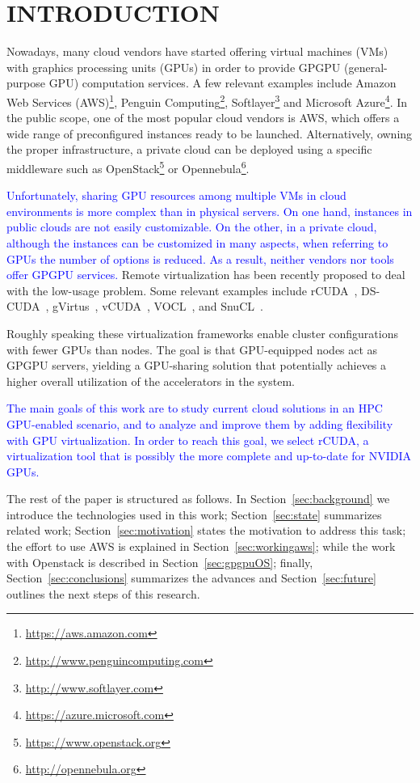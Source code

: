 \documentclass[a4paper,twoside]{article}
\begin{document}
\section{\uppercase{Introduction}}
\label{sec:introduction}
Nowadays, many cloud vendors have started offering virtual machines (VMs) with graphics processing units (GPUs) in order to provide
GPGPU (general-purpose GPU) computation services. A few relevant examples include 
Amazon Web Services (AWS)\footnote{\url{https://aws.amazon.com}}, 
Penguin Computing\footnote{\url{http://www.penguincomputing.com}}, 
Softlayer\footnote{\url{http://www.softlayer.com}} and 
Microsoft Azure\footnote{\url{https://azure.microsoft.com}}.
In the public scope, one of the most popular cloud vendors is AWS, which offers a wide range of preconfigured instances ready to be launched.
Alternatively, owning the proper infrastructure, a private cloud can be deployed using a specific middleware such as
OpenStack\footnote{\url{https://www.openstack.org}} or Opennebula\footnote{\url{http://opennebula.org}}.

\textcolor{blue}{
Unfortunately, sharing GPU resources among multiple VMs in cloud environments is more complex than in physical servers.
On one hand, instances in public clouds are not easily customizable. 
On the other, in a private cloud, although the instances can be customized in many aspects, when referring to GPUs
the number of options is reduced.
As a result, neither vendors nor tools offer GPGPU services.
}
Remote virtualization has been recently proposed to deal with the low-usage problem. Some relevant examples include {rCUDA}~\cite{tonithesis},
DS-CUDA~\cite{dscuda}, gVirtus~\cite{gvirtus}, vCUDA~\cite{vcuda}, VOCL~\cite{vocl}, and SnuCL~\cite{snucl}.

Roughly speaking these virtualization frameworks 
enable cluster configurations with fewer GPUs than nodes.  The goal is that 
GPU-equipped nodes act as GPGPU servers, yielding a GPU-sharing solution that potentially achieves
a higher overall utilization of the accelerators in the system.

\textcolor{blue}{
The main goals of this work are to study current cloud solutions in an HPC GPU-enabled scenario, and to analyze and improve 
them by adding flexibility with GPU virtualization. 
In order to reach this goal, we select rCUDA, a virtualization tool that is possibly the more complete and up-to-date for NVIDIA GPUs.
}

The rest of the paper is structured as follows. 
In Section~\ref{sec:background} we introduce the technologies used in this work;
Section~\ref{sec:state} summarizes related work; 
Section~\ref{sec:motivation} states the motivation to address this task;
the effort to use AWS is explained in Section~\ref{sec:workingaws};
while the work with Openstack is described in Section~\ref{sec:gpgpuOS};
finally, Section~\ref{sec:conclusions} summarizes the advances and Section~\ref{sec:future} outlines the next steps
 of this research.
\end{document}
